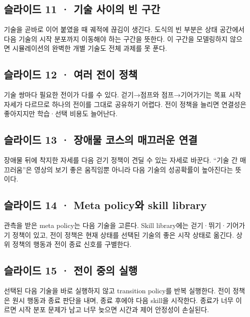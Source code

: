 \documentclass[11pt,a4paper]{article}
\begin{document}
\subsection{슬라이드 11 · 기술 사이의 빈 구간}

기술을 곧바로 이어 붙였을 때 궤적에 끊김이 생긴다. 도식의 빈 부분은 상태 공간에서 다음 기술의 시작 분포까지 이동해야 하는 구간을 뜻한다. 이 구간을 모델링하지 않으면 시뮬레이션의 완벽한 개별 기술도 전체 과제를 못 푼다.\par

\subsection{슬라이드 12 · 여러 전이 정책}

기술 쌍마다 필요한 전이가 다를 수 있다. 걷기→점프와 점프→기어가기는 목표 시작 자세가 다르므로 하나의 전이를 그대로 공유하기 어렵다. 전이 정책을 늘리면 연결성은 좋아지지만 학습·선택 비용도 늘어난다.\par

\subsection{슬라이드 13 · 장애물 코스의 매끄러운 연결}

장애물 뒤에 착지한 자세를 다음 걷기 정책이 견딜 수 있는 자세로 바꾼다. “기술 간 매끄러움”은 영상의 보기 좋은 움직임뿐 아니라 다음 기술의 성공확률이 높아진다는 뜻이다.\par

\subsection{슬라이드 14 · Meta policy와 skill library}

관측을 받은 meta policy는 다음 기술을 고른다. Skill library에는 걷기·뛰기·기어가기 정책이 있고, 전이 정책은 현재 상태를 선택된 기술의 좋은 시작 상태로 옮긴다. 상위 정책의 행동과 전이 종료 신호를 구별한다.\par

\subsection{슬라이드 15 · 전이 중의 실행}

선택된 다음 기술을 바로 실행하지 않고 transition policy를 반복 실행한다. 전이 정책은 원시 행동과 종료 판단을 내며, 종료 후에야 다음 skill을 시작한다. 종료가 너무 이르면 시작 분포 문제가 남고 너무 늦으면 시간과 제어 안정성이 손실된다.\par
\end{document}
